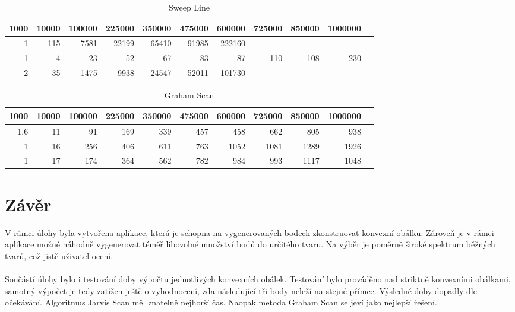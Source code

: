 \documentclass[a4paper, 12pt]{article}
\begin{document}
\begin{table}[h]
	\begin{tabular}{|r|r|r|r|r|r|r|r|r|r|r|}
	\hline
	 \textbf{1000} 	& \textbf{10000} & \textbf{100000} & \textbf{225000} & \textbf{350000} & \textbf{475000} & \textbf{600000}  & \textbf{725000}
 & \textbf{850000}  & \textbf{1000000}\\ \hline
	 1 & 115 & 7581 &  22199 & 65410 & 91985 & 222160 & - & - & -\\ \hline
	 1 & 4 & 23 & 52 & 67 & 83 & 87 & 110 & 108 & 230  \\ \hline
	2 & 35 & 1475 & 9938 & 24547 & 52011 & 101730 & - & -& -	 \\ \hline

	
	\end{tabular}
		\caption{Sweep Line}
\end{table}


\begin{table}[h]
	\begin{tabular}{|r|r|r|r|r|r|r|r|r|r|r|}
	\hline
	 \textbf{1000} 	& \textbf{10000} & \textbf{100000} & \textbf{225000} & \textbf{350000} & \textbf{475000} & \textbf{600000}  & \textbf{725000}
 & \textbf{850000}  & \textbf{1000000}\\ \hline
	 1.6  & 11 & 91 & 169 & 339 & 457 & 458 & 662 & 805 & 938   \\ \hline
	 1 & 16 & 256 & 406 & 611 & 763 & 1052 & 1081 & 1289 & 1926 \\ \hline
	 1 & 17 & 174 & 364 & 562 & 782 & 984 & 993 & 1117 & 1048 \\ \hline

	
	\end{tabular}
		\caption{Graham Scan}
\end{table}


\clearpage
\section{Závěr}
V rámci úlohy byla vytvořena aplikace, která je schopna na vygenerovaných bodech zkonstruovat konvexní obálku. Zároveň je v rámci aplikace možné náhodně vygenerovat téměř libovolné množství bodů do určitého tvaru. Na výběr je poměrně široké spektrum běžných tvarů, což jistě uživatel ocení.\\
\\
Součástí úlohy bylo i testování doby výpočtu jednotlivých konvexních obálek. Testování bylo prováděno nad striktně konvexními obálkami, samotný výpočet je tedy zatížen ještě o vyhodnocení, zda následující tři body neleží na stejné přímce. Výsledné doby dopadly dle očekávání. Algoritmus Jarvis Scan měl znatelně nejhorší čas. Naopak metoda Graham Scan se jeví jako nejlepší řešení.
\end{document}
